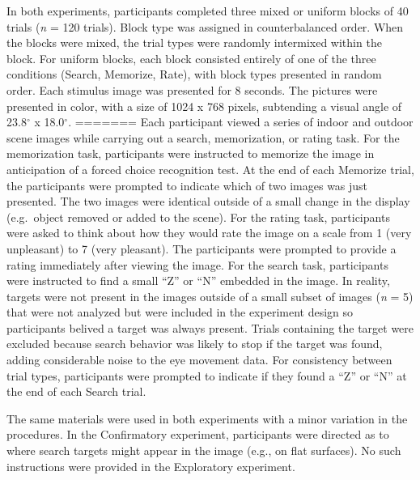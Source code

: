 \documentclass[
  english,
  man, donotrepeattitle,floatsintext]{apa6}
\begin{document}
In both experiments, participants completed three mixed or uniform blocks of 40 trials (\emph{n} = 120 trials). Block type was assigned in counterbalanced order. When the blocks were mixed, the trial types were randomly intermixed within the block. For uniform blocks, each block consisted entirely of one of the three conditions (Search, Memorize, Rate), with block types presented in random order. Each stimulus image was presented for 8 seconds. The pictures were presented in color, with a size of 1024 x 768 pixels, subtending a visual angle of 23.8\(^{\circ}\) x 18.0\(^{\circ}\).
=======
Each participant viewed a series of indoor and outdoor scene images while carrying out a search, memorization, or rating task. For the memorization task, participants were instructed to memorize the image in anticipation of a forced choice recognition test. At the end of each Memorize trial, the participants were prompted to indicate which of two images was just presented. The two images were identical outside of a small change in the display (e.g.~object removed or added to the scene). For the rating task, participants were asked to think about how they would rate the image on a scale from 1 (very unpleasant) to 7 (very pleasant). The participants were prompted to provide a rating immediately after viewing the image. For the search task, participants were instructed to find a small \enquote{Z} or \enquote{N} embedded in the image. In reality, targets were not present in the images outside of a small subset of images (\emph{n} = 5) that were not analyzed but were included in the experiment design so participants belived a target was always present. Trials containing the target were excluded because search behavior was likely to stop if the target was found, adding considerable noise to the eye movement data. For consistency between trial types, participants were prompted to indicate if they found a \enquote{Z} or \enquote{N} at the end of each Search trial.

The same materials were used in both experiments with a minor variation in the procedures. In the Confirmatory experiment, participants were directed as to where search targets might appear in the image (e.g., on flat surfaces). No such instructions were provided in the Exploratory experiment.
\end{document}
